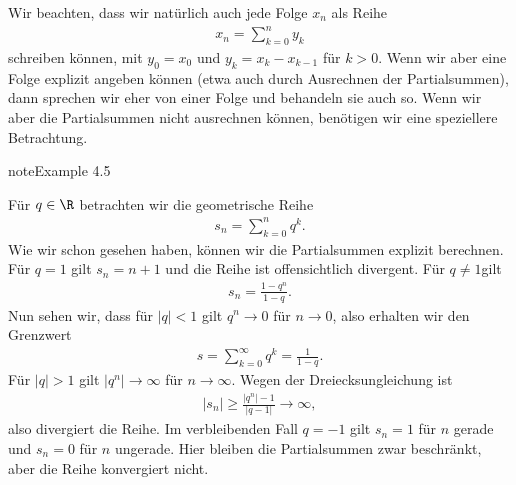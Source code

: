 \documentclass[letterpaper,10pt,english]{jupyterBook}
\begin{document}
Wir beachten, dass wir natürlich auch jede Folge \(x_n\) als Reihe
\begin{equation*}
\begin{split} x_n =\sum_{k=0}^n y_k\end{split}
\end{equation*}
schreiben können, mit \(y_0=x_0\) und \(y_k = x_k - x_{k-1}\) für \(k > 0\). Wenn wir aber eine Folge explizit angeben können (etwa auch durch Ausrechnen der Partialsummen), dann sprechen wir eher von einer Folge und behandeln sie auch so. Wenn wir aber die Partialsummen nicht ausrechnen können, benötigen wir eine speziellere Betrachtung.
\label{metrik/reihen:example-1}
\begin{sphinxadmonition}{note}{Example 4.5}



Für \(q \in \R\) betrachten wir die geometrische Reihe
\begin{equation*}
\begin{split} s_n = \sum_{k=0}^n q^k.\end{split}
\end{equation*}
Wie wir schon gesehen haben, können wir die Partialsummen explizit berechnen. Für \(q=1\) gilt \(s_n = n+1\) und die Reihe ist offensichtlich divergent. Für \(q\neq 1 \)gilt
\begin{equation*}
\begin{split} s_n = \frac{1-q^n}{1-q}.\end{split}
\end{equation*}
Nun sehen wir, dass für \(|q| <1\) gilt \(q^n \rightarrow 0\) für \(n \rightarrow 0\), also erhalten wir den Grenzwert
\begin{equation*}
\begin{split} s  = \sum_{k=0}^\infty q^k = \frac{1}{1-q}.\end{split}
\end{equation*}
Für \(|q|>1\) gilt \(|q^n| \rightarrow \infty\) für \(n \rightarrow \infty\). Wegen der Dreiecksungleichung ist
\begin{equation*}
\begin{split} |s_n| \geq \frac{|q^n|-1}{|q-1|} \rightarrow \infty,\end{split}
\end{equation*}
also divergiert die Reihe.
Im verbleibenden Fall \(q=-1\) gilt \(s_n=1\) für \(n\) gerade und \(s_n=0\) für \(n\) ungerade. Hier bleiben die Partialsummen zwar beschränkt, aber die Reihe konvergiert nicht.
\end{sphinxadmonition}
\label{metrik/reihen:example-2}
\end{document}
